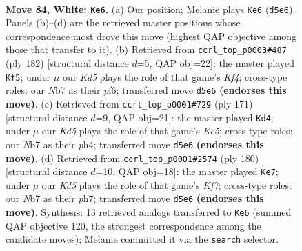 \documentclass[11pt]{article}
\begin{document}
\clearpage

\begin{figure}[p]\centering
\begin{subfigure}{0.46\textwidth}\centering
\resizebox{\linewidth}{!}{%
\newchessgame
\chessboard[
  setfen={6k1/1NP5/8/3KB3/8/8/2r5/8 w - - 81 84},
  showmover=false,
  pgfstyle=straightmove, color=movearrow, markmove={d5-e6}
]}
\caption{}
\end{subfigure}\hfill
\begin{subfigure}{0.46\textwidth}\centering
\resizebox{\linewidth}{!}{%
\newchessgame
\chessboard[
  setfen={8/1P6/3k1p2/8/5K2/5B2/1r6/8 w - - 10 92},
  showmover=false,
  pgfstyle=straightmove, color=movearrow, markmove={f4-f5}
]}
\caption{}
\end{subfigure}
\\[4pt]
\begin{subfigure}{0.46\textwidth}\centering
\resizebox{\linewidth}{!}{%
\newchessgame
\chessboard[
  setfen={8/4K3/8/2R4p/4k1bP/8/8/8 b - - 28 86},
  showmover=false,
  pgfstyle=straightmove, color=movearrow, markmove={e4-d4}
]}
\caption{}
\end{subfigure}\hfill
\begin{subfigure}{0.46\textwidth}\centering
\resizebox{\linewidth}{!}{%
\newchessgame
\chessboard[
  setfen={8/5KBp/r6P/5k2/8/8/8/8 w - - 41 91},
  showmover=false,
  pgfstyle=straightmove, color=movearrow, markmove={f7-e7}
]}
\caption{}
\end{subfigure}
\caption{\textbf{Move 84, White: \texttt{Ke6}.} (a) Our position; Melanie plays \texttt{Ke6} (\texttt{d5e6}). Panels (b)--(d) are the retrieved master positions whose correspondence most drove this move (highest QAP objective among those that transfer to it). (b) Retrieved from \texttt{ccrl\_top\_p0003\#487} (ply 182) [structural distance $d$=5, QAP obj=22]: the master played \texttt{Kf5}; under $\mu$ our \emph{Kd5} plays the role of that game's \emph{Kf4}; cross-type roles: our \emph{N}b7 as their \emph{p}f6; transferred move \texttt{d5e6} \textbf{(endorses this move)}. (c) Retrieved from \texttt{ccrl\_top\_p0001\#729} (ply 171) [structural distance $d$=9, QAP obj=21]: the master played \texttt{Kd4}; under $\mu$ our \emph{Kd5} plays the role of that game's \emph{Ke5}; cross-type roles: our \emph{N}b7 as their \emph{p}h4; transferred move \texttt{d5e6} \textbf{(endorses this move)}. (d) Retrieved from \texttt{ccrl\_top\_p0001\#2574} (ply 180) [structural distance $d$=10, QAP obj=18]: the master played \texttt{Ke7}; under $\mu$ our \emph{Kd5} plays the role of that game's \emph{Kf7}; cross-type roles: our \emph{N}b7 as their \emph{p}h7; transferred move \texttt{d5e6} \textbf{(endorses this move)}. Synthesis: 13 retrieved analogs transferred to \texttt{Ke6} (summed QAP objective 120, the strongest correspondence among the candidate moves); Melanie committed it via the \texttt{search} selector.}
\label{fig:thought-m166}
\end{figure}
\end{document}

